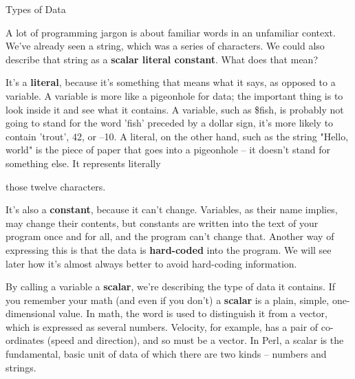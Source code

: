 \documentclass[a4paper,11pt]{book}
\begin{document}
\noindent 

\noindent 

\noindent Types of Data

\noindent 

\noindent A lot of programming jargon is about familiar words in an unfamiliar context. We've already seen a string, which was a series of characters. We could also describe that string as a \textbf{scalar literal constant}. What does that mean?

\noindent 

\noindent It's a \textbf{literal}, because it's something that means what it says, as opposed to a variable. A variable is more like a pigeonhole for data; the important thing is to look inside it and see what it contains. A variable, such as \$fish, is probably not going to stand for the word 'fish' preceded by a dollar sign, it's more likely to contain 'trout', 42, or --10. A literal, on the other hand, such as the string "Hello, world" is the piece of paper that goes into a pigeonhole -- it doesn't stand for something else. It represents literally

\noindent those twelve characters.

\noindent 

\noindent It's also a \textbf{constant}, because it can't change. Variables, as their name implies, may change their contents, but constants are written into the text of your program once and for all, and the program can't change that. Another way of expressing this is that the data is \textbf{hard-coded }into the program. We will see later how it's almost always better to avoid hard-coding information.

\noindent  

\noindent  

\noindent  

\noindent  

\noindent 

\noindent 

\noindent By calling a variable a \textbf{scalar}, we're describing the type of data it contains. If you remember your math (and even if you don't) a \textbf{scalar }is a plain, simple, one-dimensional value. In math, the word is used to distinguish it from a vector, which is expressed as several numbers. Velocity, for example, has a pair of co-ordinates (speed and direction), and so must be a vector. In Perl, a scalar is the fundamental, basic unit of data of which there are two kinds -- numbers and strings.
\end{document}
